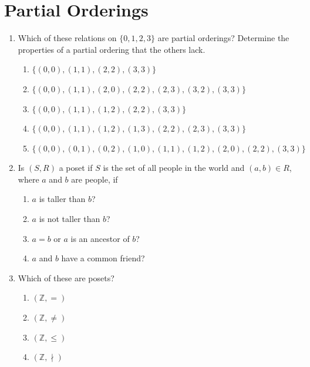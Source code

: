 \documentclass{sig-alternate-05-2015}
\begin{document}
\section{Partial Orderings}
\begin{enumerate}
\item Which of these relations on $\{0, 1, 2, 3\}$ are partial orderings? Determine the properties of a partial ordering that
the others lack.
	\begin{enumerate}
		\item $\{(0, 0), (1, 1), (2, 2), (3, 3)\}$ 
		\item $\{(0, 0), (1, 1), (2, 0), (2, 2), (2, 3), (3, 2), (3, 3)\}$
		\item $\{(0, 0), (1, 1), (1, 2), (2, 2), (3, 3)\}$
		\item $\{(0, 0), (1, 1), (1, 2), (1, 3), (2, 2), (2, 3), (3, 3)\}$
		\item $\{(0, 0), (0, 1), (0, 2), (1, 0), (1, 1), (1, 2), (2, 0), (2, 2), (3, 3)\}$
	\end{enumerate}

\item Is $(S,R)$ a poset if $S$ is the set of all people in the world
and $(a, b) \in R$, where $a$ and $b$ are people, if
\begin{enumerate}
	\item $a$ is taller than $b$?
	\item $a$ is not taller than $b$?
	\item $a = b$ or $a$ is an ancestor of $b$?
	\item $a$ and $b$ have a common friend?
\end{enumerate}

\item Which of these are posets?
\begin{enumerate}
	\item $(\mathbb{Z}, =)$
	\item $(\mathbb{Z}, \ne)$
	\item $(\mathbb{Z}, \le)$
	\item $(\mathbb{Z}, \nmid)$
\end{enumerate}


\end{enumerate}
\end{document}
